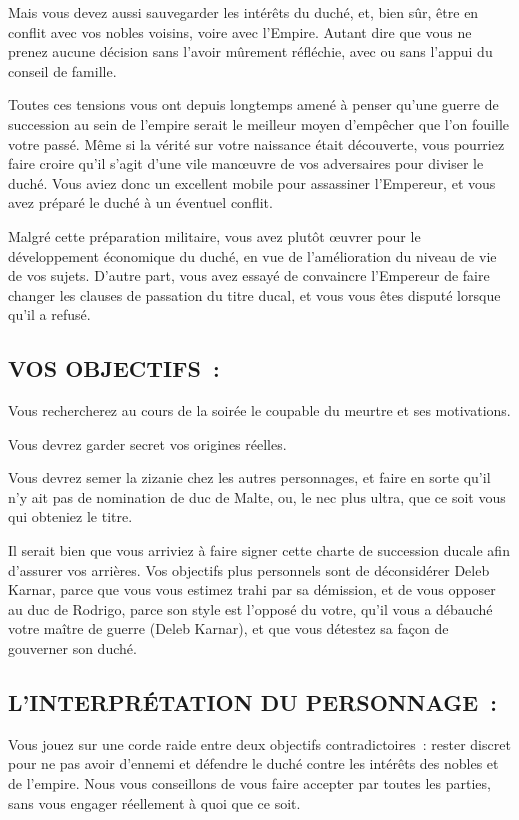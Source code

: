 \documentclass[14pt,twocolumn]{extarticle}
\begin{document}
Mais vous devez aussi sauvegarder les intérêts du duché, et, bien sûr, être en
conflit avec vos nobles voisins, voire avec l'Empire. Autant dire que vous ne
prenez aucune décision sans l'avoir mûrement réfléchie, avec ou sans l'appui du
conseil de famille.

Toutes ces tensions vous ont depuis longtemps amené à penser qu'une guerre de
succession au sein de l'empire serait le meilleur moyen d’empêcher que l'on
fouille votre passé. Même si la vérité sur votre naissance était découverte,
vous pourriez faire croire qu'il s'agit d'une vile man\oe{}uvre de vos
adversaires pour diviser le duché. Vous aviez donc un excellent mobile
pour assassiner l'Empereur, et vous avez préparé le duché à un éventuel
conflit.

Malgré cette préparation militaire, vous avez plutôt \oe{}uvrer pour le
développement économique du duché, en vue de l'amélioration du niveau de vie de
vos sujets. D'autre part, vous avez essayé de convaincre l'Empereur de faire
changer les clauses de passation du titre ducal, et vous vous êtes disputé
lorsque qu'il a refusé.

\subsection{VOS OBJECTIFS~:}

Vous rechercherez au cours de la soirée le coupable du meurtre et ses
motivations.

Vous devrez garder secret vos origines réelles.

Vous devrez semer la zizanie chez les autres personnages, et faire en sorte
qu'il n'y ait pas de nomination de duc de Malte, ou, le nec plus ultra, que ce
soit vous qui obteniez le titre.

Il serait bien que vous arriviez à faire signer cette charte de succession
ducale afin d'assurer vos arrières. Vos objectifs plus personnels sont de
déconsidérer Deleb Karnar, parce que vous vous estimez trahi par sa démission,
et de vous opposer au duc de Rodrigo, parce son style est l'opposé du votre,
qu'il vous a débauché votre maître de guerre (Deleb Karnar), et que vous
détestez sa façon de gouverner son duché.

\subsection{L'INTERPRÉTATION DU PERSONNAGE~:}

Vous jouez sur une corde raide entre deux objectifs contradictoires~: rester
discret pour ne pas avoir d'ennemi et défendre le duché contre les intérêts des
nobles et de l'empire. Nous vous conseillons de vous faire accepter par toutes
les parties, sans vous engager réellement à quoi que ce soit.
\end{document}
